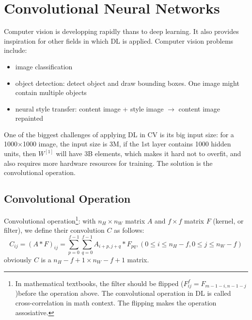 \ifx\PREAMBLE\undefined


\fi
\chapter{Convolutional Neural Networks}
Computer vision is developping rapidly thans to deep learning. It also provides inspiration for other fields in which DL is applied. Computer vision problems include: 
\begin{itemize}
  \item image classification
  \item object detection: detect object and draw bounding boxes. One image might contain multiple objects
  \item neural style transfer: content image + style image $\rightarrow$ content image repainted
\end{itemize}
One of the biggest challenges of applying DL in CV is its big input size: for a 1000$\times$1000 image, the input size is 3M, if the 1st layer contains 1000 hidden units, then $W^{[1]}$ will have 3B elements, which makes it hard not to overfit, and also requires more hardware resources for training. The solution is the convolutional operation.
\section{Convolutional Operation}
Convolutional operation\footnote{In mathematical textbooks, the filter should be flipped ($F^f_{ij}=F_{m-1-i, n-1-j}$)before the operation above. The convolutional operation in DL is called cross-correlation in math context. The flipping makes the operation assosiative.}: with $n_H\times n_W$ matrix $A$ and $f\times f$ matrix $F$ (kernel, or filter), we define their convolution $C$ as follows:
    \[C_{ij}=\left(A*F\right)_{ij}=\displaystyle\sum_{p=0}^{f-1}\displaystyle\sum_{q=0}^{f-1}A_{i+p,j+q}*F_{pq}, \left(0\le i\le n_H-f, 0\le j\le n_W-f\right)\]
obviously $C$ is a $n_H-f+1\times n_W-f+1$ matrix.
